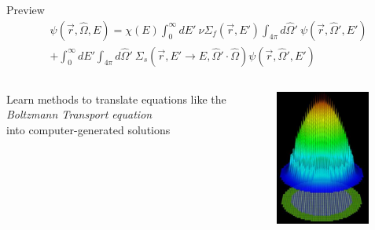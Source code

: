 \documentclass[xcolor=x11names,compress]{beamer}
\renewcommand{\(}{\begin{columns}}
\renewcommand{\)}{\end{columns}}
\newcommand{\<}[1]{\begin{column}{#1}}
\renewcommand{\>}{\end{column}}
\newcommand{\Macro}{\ensuremath{\Sigma}}
\newcommand{\vOmega}{\ensuremath{\hat{\Omega}}}
\begin{document}

\begin{frame}{Preview}
\begin{align}
  [\vOmega \cdot \nabla + \Macro(\vec{r}, E)] &\psi(\vec{r}, \vOmega, E)  = \chi(E) \int_0^{\infty} dE' \:\nu \Macro_{f}(\vec{r}, E') \int_{4\pi} d\vOmega' \:\psi(\vec{r}, \vOmega', E')  \nonumber \\
   &+ \int_0^{\infty} dE' \int_{4\pi} d\vOmega' \:\Macro_{s}(\vec{r}, E' \to E, \vOmega' \cdot \vOmega) \psi(\vec{r}, \vOmega', E')  \nonumber
\end{align}
\vspace{-2em}
\begin{columns}
  \begin{column}{0.5\textwidth}
    Learn methods to translate equations like the \\\emph{Boltzmann Transport equation} \\into computer-generated solutions
  \end{column}
  \begin{column}{0.5\textwidth}
    \begin{figure}
    \includegraphics[height=1.75in,clip]{../figs/UNIC_powerDist}
    \end{figure}
  \end{column}
\end{columns}
\end{frame}
\end{document}
